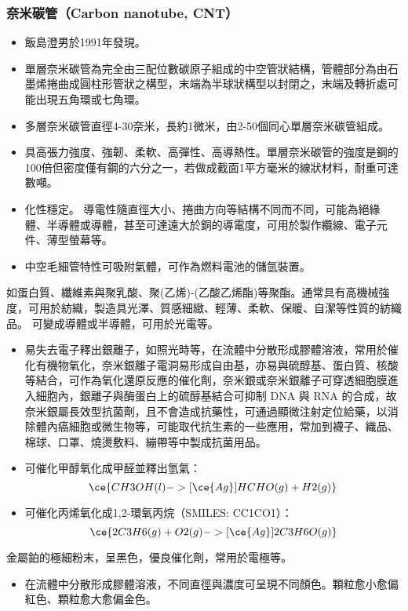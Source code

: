 \documentclass[a4paper,12pt]{report}
\begin{document}
\begin{itemize}
\begin{itemize}
\subsubsection{奈米碳管（Carbon nanotube, CNT）}
\begin{itemize}
\item 飯島澄男於1991年發現。
\item 單層奈米碳管為完全由三配位數碳原子組成的中空管狀結構，管體部分為由石墨烯捲曲成圓柱形管狀之構型，末端為半球狀構型以封閉之，末端及轉折處可能出現五角環或七角環。
\item 多層奈米碳管直徑4-30奈米，長約1微米，由2-50個同心單層奈米碳管組成。
\item 具高張力強度、強韌、柔軟、高彈性、高導熱性。單層奈米碳管的強度是鋼的100倍但密度僅有鋼的六分之一，若做成截面1平方毫米的線狀材料，耐重可達數噸。
\item 化性穩定。
導電性隨直徑大小、捲曲方向等結構不同而不同，可能為絕緣體、半導體或導體，甚至可達遠大於銅的導電度，可用於製作纜線、電子元件、薄型螢幕等。
\item 中空毛細管特性可吸附氣體，可作為燃料電池的儲氫裝置。
\end{itemize}
如蛋白質、纖維素與聚乳酸、聚(乙烯)-(乙酸乙烯酯)等聚酯。通常具有高機械強度，可用於紡織，製造具光澤、質感細緻、輕薄、柔軟、保暖、自潔等性質的紡織品。
可變成導體或半導體，可用於光電等。
\begin{itemize}
\item 易失去電子釋出銀離子，如照光時等，在流體中分散形成膠體溶液，常用於催化有機物氧化，奈米銀離子電洞易形成自由基，亦易與硫醇基、蛋白質、核酸等結合，可作為氧化還原反應的催化劑，奈米銀或奈米銀離子可穿透細胞膜進入細胞內，銀離子與酶蛋白上的硫醇基結合可抑制 DNA 與 RNA 的合成，故奈米銀屬長效型抗菌劑，且不會造成抗藥性，可通過顯微注射定位給藥，以消除體內癌細胞或微生物等，可能取代抗生素的一些應用，常加到襪子、織品、棉球、口罩、燒燙敷料、繃帶等中製成抗菌用品。
\item 可催化甲醇氧化成甲醛並釋出氫氣：
\[\ce{CH3OH(l) ->[\ce{Ag}] HCHO(g) + H2(g)}\]
\item 可催化丙烯氧化成1,2-環氧丙烷（SMILES: CC1CO1）：
\[\ce{2C3H6(g) + O2(g) ->[\ce{Ag}] 2C3H6O(g)}\]
\end{itemize}
金屬鉑的極細粉末，呈黑色，優良催化劑，常用於電極等。
\begin{itemize}
\item 在流體中分散形成膠體溶液，不同直徑與濃度可呈現不同顏色。顆粒愈小愈偏紅色、顆粒愈大愈偏金色。

\end{itemize}
\end{itemize}
\end{itemize}
\end{document}
